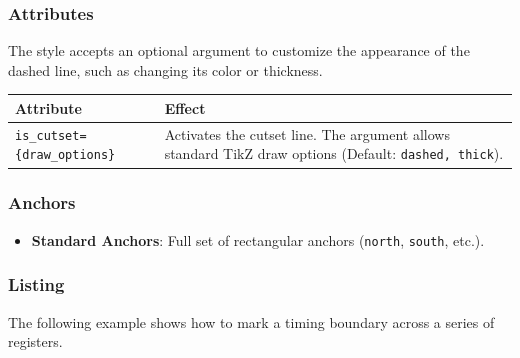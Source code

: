     \subsubsection{\sffamily Attributes}
        The style accepts an optional argument to customize the appearance of the dashed line, such as changing its color or thickness.

    \begin{center}
        \begin{tabular}{lp{8cm}}
        \toprule
            \textbf{Attribute} & \textbf{Effect} \\
            \midrule
            \texttt{is\_cutset=\{draw\_options\}} & Activates the cutset line. The argument allows standard TikZ draw options (Default: \texttt{dashed, thick}). \\
            \bottomrule
        \end{tabular}
    \end{center}

    \subsubsection{\sffamily Anchors}
            \begin{itemize}
                \item \textbf{Standard Anchors}: Full set of rectangular anchors (\texttt{north}, \texttt{south}, etc.).
            \end{itemize}

    \subsubsection{\sffamily Listing}
        The following example shows how to mark a timing boundary across a series of registers.

\begin{RTLexample}
\end{RTLexample}


